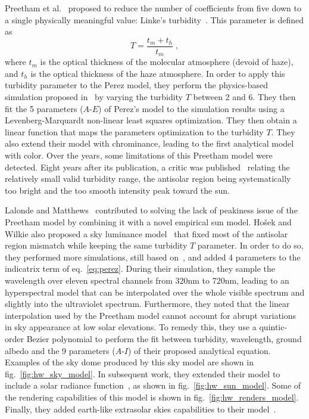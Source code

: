 Preetham et al.~\cite{preetham-siggraph-99} proposed to reduce the number of coefficients from five down to a single physically meaningful value: Linke's turbidity~\cite{mccartney1976optics}. This parameter is defined as
\begin{equation}
T = \frac{t_m + t_h}{t_m} \;,
\end{equation}
where $t_m$ is the optical thickness of the molecular atmosphere (devoid of haze), and $t_h$ is the optical thickness of the haze atmosphere. In order to apply this turbidity parameter to the Perez model, they perform the physics-based simulation proposed in~\cite{nishita1996display} by varying the turbidity $T$ between 2 and 6. They then fit the 5 parameters ($A$-$E$) of Perez's model to the simulation results using a Levenberg-Marquardt non-linear least squares optimization. They then obtain a linear function that maps the parameters optimization to the turbidity $T$. They also extend their model with chrominance, leading to the first analytical model with color. 
Over the years, some limitations of this Preetham model were detected. Eight years after its publication, a critic was published~\cite{zotti2007critical} relating the relatively small valid turbidity range, the antisolar region being systematically too bright and the too smooth intensity peak toward the sun.

Lalonde and Matthews~\cite{lalonde-3dv-14} contributed to solving the lack of peakiness issue of the Preetham model by combining it with a novel empirical sun model. Ho\v{s}ek and Wilkie also proposed a sky luminance model~\cite{hosek-siggraph-12} that fixed most of the antisolar region mismatch while keeping the same turbidity $T$ parameter. In order to do so, they performed more simulations, still based on~\cite{nishita1996display}, and added 4 parameters to the indicatrix term of eq.~\eqref{eq:perez}. During their simulation, they sample the wavelength over eleven spectral channels from 320nm to 720nm, leading to an hyperspectral model that can be interpolated over the whole visible spectrum and slightly into the ultraviolet spectrum. Furthermore, they noted that the linear interpolation used by the Preetham model cannot account for abrupt variations in sky appearance at low solar elevations. To remedy this, they use a quintic-order Bezier polynomial to perform the fit between turbidity, wavelength, ground albedo and the 9 parameters ($A$-$I$) of their proposed analytical equation. Examples of the sky dome produced by this sky model are shown in fig.~\ref{fig:hw_sky_model}. In subsequent work, they extended their model to include a solar radiance function~\cite{hosek-cga-13}, as shown in fig.~\ref{fig:hw_sun_model}. Some of the rendering capabilities of this model is shown in fig.~\ref{fig:hw_renders_model}. Finally, they added earth-like extrasolar skies capabilities to their model~\cite{wilkie2013predicting}.



